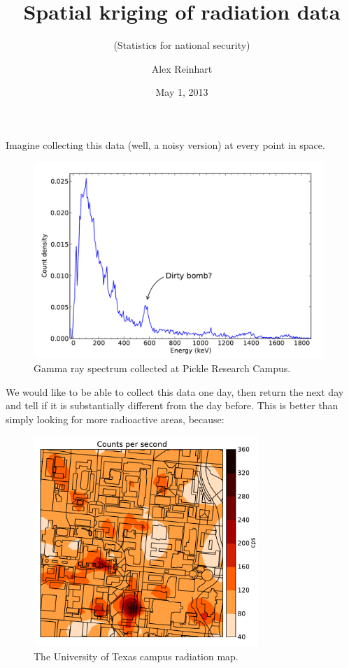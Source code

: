 \documentclass[ignorenonframetext]{beamer}
\title[Radiation kriging]{Spatial kriging of radiation data}
\subtitle{(Statistics for national security)}
\author{Alex Reinhart}
\institute{Applied Research Labs}
\date{May 1, 2013}
\begin{document}
\maketitle

\begin{frame}
\titlepage
\end{frame}

Imagine collecting this data (well, a noisy version) at every point in space.

\begin{frame}
  \begin{figure}
    \includegraphics[width=110mm]{figures/talk-bomb-spectrum.pdf}
    \caption{Gamma ray spectrum collected at Pickle Research Campus.}
  \end{figure}
\end{frame}

We would like to be able to collect this data one day, then return the next day
and tell if it is substantially different from the day before. This is better
than simply looking for more radioactive areas, because:

\begin{frame}
  \begin{figure}
    \includegraphics[width=85mm]{figures/talk-campus-map.pdf}
    \caption{The University of Texas campus radiation map.}
  \end{figure}
\end{frame}
\end{document}
